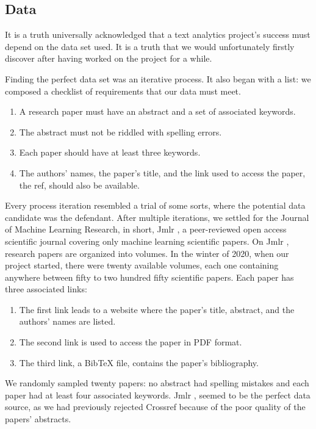 \subsection{Data}

It is a truth universally acknowledged that a text analytics project's success must depend on the data set used. It is a truth that we would unfortunately firstly discover after having worked on the project for a while. 


Finding the perfect data set was an iterative process. It also began with a list: we composed a checklist of requirements that our data must meet. 
\begin{enumerate}
	\item A research paper must have an abstract and a set of associated keywords. 
	\item The abstract must not be riddled with spelling errors. 
	\item Each paper should have at least three keywords.
	\item The authors' names, the paper's title, and the link used to access the paper, the ref, should also be available.
\end{enumerate}

Every process iteration resembled a trial of some sorts, where the potential data candidate was the defendant. After multiple iterations, we settled for the Journal of Machine Learning Research, in short, Jmlr \cite{jmlr}, a peer-reviewed open access scientific journal covering only machine learning scientific papers.
On Jmlr \cite{jmlr}, research papers are organized into volumes. In the winter of 2020, when our project started, there were twenty available volumes, each one containing anywhere between fifty to two hundred fifty scientific papers. Each paper has three associated links: 
\begin{enumerate}
	\item The first link leads to a website where the paper's title, abstract, and the authors' names are listed. 
	\item The second link is used to access the paper in PDF format. 
	\item The third link, a BibTeX file, contains the paper's bibliography.
\end{enumerate}

We randomly sampled twenty papers: no abstract had spelling mistakes and each paper had at least four associated keywords. Jmlr \cite{jmlr}, seemed to be the perfect data source, as we had previously rejected Crossref \cite{crossref} because of the poor quality of the papers' abstracts.


